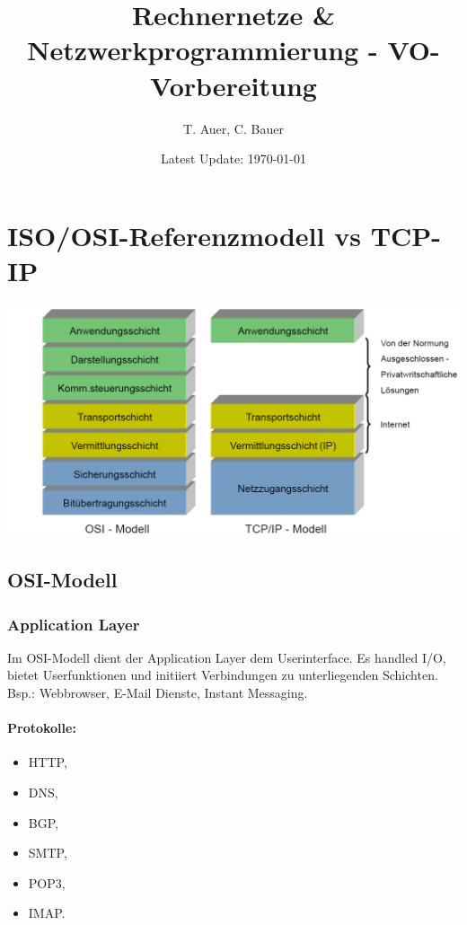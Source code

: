 \documentclass{scrartcl}
\title{Rechnernetze \& Netzwerkprogrammierung - VO-Vorbereitung}
\author{T. Auer, C. Bauer} %
\date{Latest Update: \today}
\begin{document}
\maketitle
\hrulefill
\tableofcontents
\hrulefill
\newpage
    
\section{ISO/OSI-Referenzmodell vs TCP-IP}
    \begin{center}
        \includegraphics[width=\textwidth]{tcp_ip_model.png}
    \end{center}
    \subsection{OSI-Modell}
    \subsubsection{Application Layer}
    \label{OSI:application_layer}
    Im OSI-Modell dient der Application Layer dem Userinterface. Es handled I/O, bietet Userfunktionen und initiiert Verbindungen zu unterliegenden Schichten.
    Bsp.: Webbrowser, E-Mail Dienste, Instant Messaging.
    \paragraph{Protokolle:}
    \begin{itemize}
        \item HTTP,
        \item DNS,
        \item BGP, 
        \item SMTP, 
        \item POP3,
        \item IMAP.
    \end{itemize}
\end{document}
